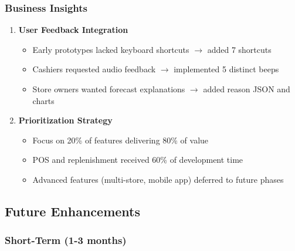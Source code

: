 \subsubsection{Business Insights}

\begin{enumerate}[leftmargin=*]
    \item \textbf{User Feedback Integration}
    \begin{itemize}
        \item Early prototypes lacked keyboard shortcuts $\rightarrow$ added 7 shortcuts
        \item Cashiers requested audio feedback $\rightarrow$ implemented 5 distinct beeps
        \item Store owners wanted forecast explanations $\rightarrow$ added reason JSON and charts
    \end{itemize}
    
    \item \textbf{Prioritization Strategy}
    \begin{itemize}
        \item Focus on 20\% of features delivering 80\% of value
        \item POS and replenishment received 60\% of development time
        \item Advanced features (multi-store, mobile app) deferred to future phases
    \end{itemize}
\end{enumerate}

\subsection{Future Enhancements}

\subsubsection{Short-Term (1-3 months)}

